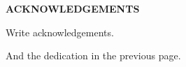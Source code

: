 \begin{centering}
\textbf{ACKNOWLEDGEMENTS}\\
\vspace{\baselineskip}
\end{centering}

\begin{placeholder}[ACK]
    Write acknowledgements.

    And the dedication in the previous page.
\end{placeholder}

